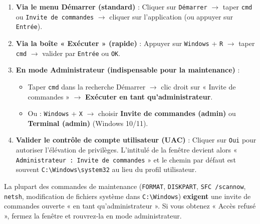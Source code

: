 \documentclass[11pt]{article}
\begin{document}
\begin{methode}
\begin{enumerate}
    \item \textbf{Via le menu Démarrer (standard)} : Cliquer sur \texttt{Démarrer} $\rightarrow$ taper \texttt{cmd} ou \texttt{Invite de commandes} $\rightarrow$ cliquer sur l'application (ou appuyer sur \texttt{Entrée}).
    \item \textbf{Via la boîte « Exécuter » (rapide)} : Appuyer sur \texttt{Windows} + \texttt{R} $\rightarrow$ taper \texttt{cmd} $\rightarrow$ valider par \texttt{Entrée} ou \texttt{OK}.
    \item \textbf{En mode Administrateur (indispensable pour la maintenance)} :
    \begin{itemize}
        \item Taper \texttt{cmd} dans la recherche Démarrer $\rightarrow$ clic droit sur « Invite de commandes » $\rightarrow$ \textbf{Exécuter en tant qu'administrateur}.
        \item Ou : \texttt{Windows} + \texttt{X} $\rightarrow$ choisir \textbf{Invite de commandes (admin)} ou \textbf{Terminal (admin)} (Windows 10/11).
    \end{itemize}
    \item \textbf{Valider le contrôle de compte utilisateur (UAC)} : Cliquer sur \texttt{Oui} pour autoriser l'élévation de privilèges. L'intitulé de la fenêtre devient alors « \texttt{Administrateur : Invite de commandes} » et le chemin par défaut est souvent \texttt{C:\textbackslash Windows\textbackslash system32} au lieu du profil utilisateur.
\end{enumerate}
\end{methode}

\begin{attention}
La plupart des commandes de maintenance (\texttt{FORMAT}, \texttt{DISKPART}, \texttt{SFC /scannow}, \texttt{netsh}, modification de fichiers système dans \texttt{C:\textbackslash Windows}) \textbf{exigent} une invite de commandes ouverte « en tant qu'administrateur ». Si vous obtenez « Accès refusé », fermez la fenêtre et rouvrez-la en mode administrateur.
\end{attention}
\end{document}
